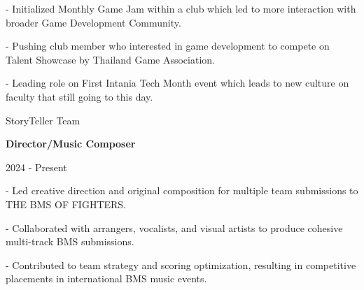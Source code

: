 \documentclass[10pt]{article}
\begin{document}
\begin{minipage}{\textwidth}
        \vspace{0.35em}
        \hspace{0.1em}
        \begin{minipage}{0.99\textwidth}
            \normalsize
            \begingroup
            - \hspace{0.5em} Initialized Monthly Game Jam within a club which led to more interaction with broader Game Development Community.\par
            - \hspace{0.5em} Pushing club member who interested in game development to compete on Talent Showcase by Thailand Game Association.\par
            - \hspace{0.5em} Leading role on First Intania Tech Month event which leads to new culture on faculty that still going to this day.\par
            \endgroup
        \end{minipage}

        \vspace{1em}

        \begin{minipage}{0.55\textwidth}
            \normalsize
            \begingroup
                StoryTeller Team\par
                \textbf{Director/Music Composer}\par
            \endgroup
        \end{minipage}
        \hfill
        \begin{minipage}{0.125\textwidth}
            \normalsize
             - Present
            \endgroup
        \end{minipage}

        \vspace{0.25em}
        \hspace{0.1em}
        \begin{minipage}{0.99\textwidth}
            \normalsize
            \begingroup
            - \hspace{0.5em} Led creative direction and original composition for multiple team submissions to THE BMS OF FIGHTERS.\par
            - \hspace{0.5em} Collaborated with arrangers, vocalists, and visual artists to produce cohesive multi-track BMS submissions.\par
            - \hspace{0.5em} Contributed to team strategy and scoring optimization, resulting in competitive placements in international BMS music events.\par
            \endgroup
        \end{minipage}
    \end{minipage}
\end{document}
